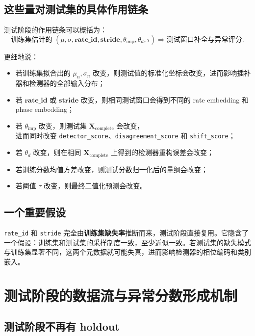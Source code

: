 \documentclass[UTF8]{ctexart}
\begin{document}
\subsection{这些量对测试集的具体作用链条}

测试阶段的作用链条可以概括为：
\begin{equation}
    \text{训练集估计的 } (\mu,\sigma,\bm{rate\_id},\bm{stride},\theta_{\text{imp}},\theta_d,\tau)
    \Longrightarrow
    \text{测试窗口补全与异常评分}.
\end{equation}

更细地说：
\begin{itemize}
    \item 若训练集拟合出的 \(\mu_n,\sigma_n\) 改变，则测试值的标准化坐标会改变，进而影响插补器和检测器的全部输入分布；
    \item 若 \(\bm{rate\_id}\) 或 \(\bm{stride}\) 改变，则相同测试窗口会得到不同的 rate embedding 和 phase embedding；
    \item 若 \(\theta_{\text{imp}}\) 改变，则测试集 \(\bm{X}_{\text{complete}}\) 会改变，\\
    进而同时改变 \texttt{detector\_score}、\texttt{disagreement\_score} 和 \texttt{shift\_score}；
    \item 若 \(\theta_d\) 改变，则在相同 \(\bm{X}_{\text{complete}}\) 上得到的检测器重构误差会改变；
    \item 若训练分数均值方差改变，则测试分数归一化后的量纲会改变；
    \item 若阈值 \(\tau\) 改变，则最终二值化预测会改变。
\end{itemize}

\subsection{一个重要假设}

\texttt{rate\_id} 和 \texttt{stride} 完全由\textbf{训练集缺失率}推断而来，测试阶段直接复用。它隐含了一个假设：训练集和测试集的采样制度一致，至少近似一致。若测试集的缺失模式与训练集显著不同，这两个元数据就可能失真，进而影响检测器的相位编码和类别嵌入。

\section{测试阶段的数据流与异常分数形成机制}

\subsection{测试阶段不再有 holdout}
\end{document}
